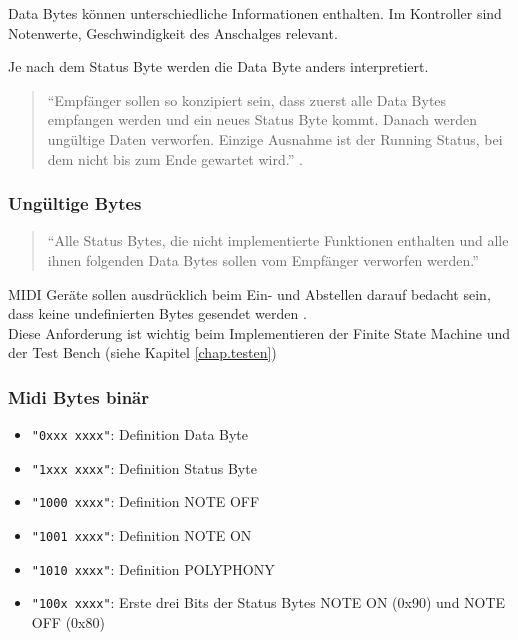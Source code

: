 Data Bytes können unterschiedliche Informationen enthalten. Im Kontroller sind Notenwerte, Geschwindigkeit des Anschalges relevant.

Je nach dem Status Byte werden die Data Byte anders interpretiert. 

\begin{quote}
``Empfänger sollen so konzipiert sein, dass zuerst alle Data Bytes empfangen werden und ein neues Status Byte kommt. Danach werden ungültige Daten verworfen. Einzige Ausnahme ist der Running Status, bei dem nicht bis zum Ende gewartet wird.'' \citep{Midi_specification}.
\end{quote}

\subsubsection*{Ungültige Bytes}

\begin{quote}
``Alle Status Bytes, die nicht implementierte Funktionen enthalten und alle ihnen folgenden Data Bytes sollen vom Empfänger verworfen werden.'' \citep{Midi_specification}
\end{quote}

MIDI Geräte sollen ausdrücklich beim Ein- und Abstellen darauf bedacht sein, dass keine undefinierten Bytes gesendet werden \citep{Midi_specification}.\\
Diese Anforderung ist wichtig beim Implementieren der Finite State Machine und der Test Bench (siehe Kapitel \ref{chap.testen})

\subsubsection*{Midi Bytes binär}\label{midi_binaer}

\begin{itemize}
	\item \lstinline|"0xxx xxxx"|: Definition Data Byte
	\item \lstinline|"1xxx xxxx"|: Definition Status Byte
	\item \lstinline|"1000 xxxx"|: Definition NOTE OFF
	\item \lstinline|"1001 xxxx"|: Definition NOTE ON
	\item \lstinline|"1010 xxxx"|: Definition POLYPHONY
	\item \lstinline|"100x xxxx"|: Erste drei Bits der Status Bytes NOTE ON (0x90) und NOTE OFF (0x80)
\end{itemize}

